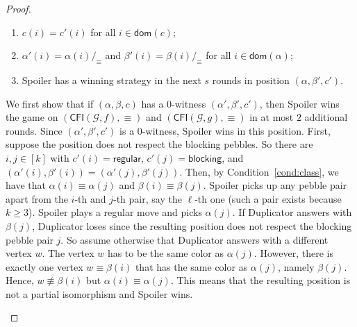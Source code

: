 \documentclass[10pt,a4paper]{article}
\newcommand{\regular}{\mathsf{regular}}
\newcommand{\blocking}{\mathsf{blocking}}
\newcommand{\comp}{\equiv}
\newcommand{\CFIsym}{\mathsf{CFI}}
\newcommand{\CFI}[1]{\CFIsym(#1)}
\newcommand{\precompCFI}[2]{{(\CFI{#1},#2)}}
\newcommand{\graphG}{\mathcal{G}}
\newcommand{\dom}{\mathsf{dom}}
\begin{document}
\begin{proof}
\begin{enumerate}
\begin{enumerate}
                \item $c(i) = c'(i)$ for all $i\in \dom(c)$;
                \item \label{cond:class}$\alpha'(i) = \alpha(i)/_\comp$ and $\beta'(i) = \beta(i)/_\comp$
                for all $i \in \dom(\alpha)$;
                \item Spoiler has a winning strategy in the next $s$  rounds in position $(\alpha,\beta',c')$. 
        \end{enumerate}
        
        
        We first show that if $(\alpha,\beta,c)$ has a $0$-witness $(\alpha',\beta',c')$,
        then Spoiler wins the game on $\precompCFI{\graphG,f}{\comp}$ and $\precompCFI{\graphG,g}{\comp}$ in at most $2$ additional rounds.
        Since $(\alpha',\beta',c')$ is a $0$-witness, Spoiler wins in this position.
        First, suppose the position does not respect the blocking pebbles.
        So there are $i,j\in[k]$ with $c'(i) = \regular$, $c'(j) = \blocking$, and
        $(\alpha'(i),\beta'(i)) = (\alpha'(j), \beta'(j))$.
        Then, by Condition~\ref{cond:class},
        we have that $\alpha(i) \comp \alpha(j)$ and  $\beta(i) \comp \beta(j)$.
        Spoiler picks up any pebble pair apart from the $i$-th and $j$-th pair,
        say the $\ell$-th one (such a pair exists because $k \geq 3$).
        Spoiler plays a regular move and picks $\alpha(j)$.
        If Duplicator answers with $\beta(j)$,
        Duplicator loses since the resulting position does not respect the blocking pebble pair $j$.
        So assume otherwise that Duplicator answers with a different vertex $w$.
        The vertex $w$ has to be the same color as $\alpha(j)$.
        However, there is exactly one vertex $w \comp \beta(i)$
        that has the same color as $\alpha(j)$, namely $\beta(j)$.
        Hence, $w \not\comp \beta(i)$ but $\alpha(i) \comp\alpha(j)$.
        This means that the resulting position is not a partial isomorphism
        and Spoiler wins.
        

\end{enumerate}
\end{proof}
\end{document}
